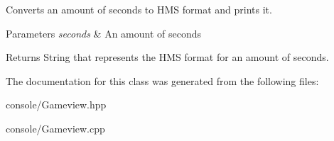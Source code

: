 Converts an amount of seconds to H\+MS format and prints it. 


\begin{DoxyParams}{Parameters}
{\em seconds} & An amount of seconds \\
\hline
\end{DoxyParams}
\begin{DoxyReturn}{Returns}
String that represents the H\+MS format for an amount of seconds. 
\end{DoxyReturn}


The documentation for this class was generated from the following files\+:\begin{DoxyCompactItemize}
\item 
console/Gameview.\+hpp\item 
console/Gameview.\+cpp\end{DoxyCompactItemize}
